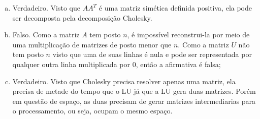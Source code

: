\documentclass[11pt]{article}
\begin{document}
\begin{exerc}
\begin{enumerate}[a.]
\
\item Verdadeiro. Visto que $AA^T$ é uma matriz simética definida positiva, ela pode ser decomposta pela decomposição Cholesky.

\item Falso. Como a matriz $A$ tem posto $n$, é impossível reconstrui-la por meio de uma multiplicação de matrizes de posto menor que $n$. Como a matriz $U$ não tem posto $n$ visto que uma de suas linhas é nula e pode ser representada por qualquer outra linha multiplicada por 0, então a afirmativa é falsa;

\item Verdadeiro. Visto que Cholesky precisa resolver apenas uma matriz, ela precisa de metade do tempo que o LU já que a LU gera duas matrizes. Porém em questão de espaço, as duas precisam de gerar matrizes intermediarias para o processamento, ou seja, ocupam o mesmo espaço.

\end{enumerate}
\end{exerc}
\end{document}
